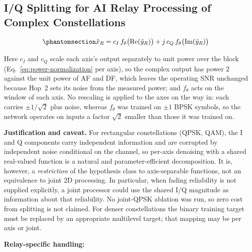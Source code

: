 \subsection{I/Q Splitting for AI Relay Processing of Complex Constellations}\label{sec:iq-splitting-for-ai-relay-processing-of-complex-constellations}

\begin{equation}\protect\phantomsection\label{eq:iq-splitting}{\hat{x}_R = c_I\, f_\theta\bigl(\text{Re}(\tilde{y}_R)\bigr) + j\, c_Q\, f_\theta\bigl(\text{Im}(\tilde{y}_R)\bigr)
}\end{equation}

Here $c_I$ and $c_Q$ scale each axis's output separately to unit power over the block (Eq.~\eqref{eq:power-normalization} per axis), so the complex output has power $2$ against the unit power of AF and DF, which leaves the operating SNR unchanged because Hop~2 sets its noise from the measured power; and $f_\theta$ acts on the window of each axis. No rescaling is applied to the axes on the way in: each carries $\pm1/\sqrt{2}$ plus noise, whereas $f_\theta$ was trained on $\pm1$ BPSK symbols, so the network operates on inputs a factor $\sqrt{2}$ smaller than those it was trained on.

\textbf{Justification and caveat.} For rectangular constellations (QPSK, QAM), the I and Q components carry independent information and are corrupted by independent noise conditional on the channel, so per-axis denoising with a shared real-valued function is a natural and parameter-efficient decomposition. It is, however, a \emph{restriction} of the hypothesis class to axis-separable functions, not an equivalence to joint 2D processing. In particular, when fading reliability is not supplied explicitly, a joint processor could use the shared I/Q magnitude as information about that reliability. No joint-QPSK ablation was run, so zero cost from splitting is not claimed. For denser constellations the binary training target must be replaced by an appropriate multilevel target; that mapping may be per axis or joint.

\textbf{Relay-specific handling:}

